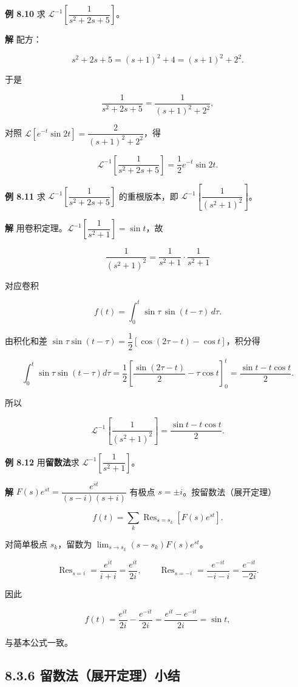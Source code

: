 \textbf{例 8.10} 求
\(\mathcal{L}^{-1}\left[\dfrac{1}{s^2+2s+5}\right]\)。

\textbf{解} 配方：

\[
s^2+2s+5=(s+1)^2+4=(s+1)^2+2^2.
\]

于是

\[
\frac{1}{s^2+2s+5}=\frac{1}{(s+1)^2+2^2},
\]

对照 \(\mathcal{L}[e^{-t}\sin 2t]=\dfrac{2}{(s+1)^2+2^2}\)，得

\[
\mathcal{L}^{-1}\left[\frac{1}{s^2+2s+5}\right]=\frac{1}{2}e^{-t}\sin 2t .
\]

\textbf{例 8.11} 求 \(\mathcal{L}^{-1}\left[\dfrac{1}{s^2+2s+5}\right]\)
的重根版本，即 \(\mathcal{L}^{-1}\left[\dfrac{1}{(s^2+1)^2}\right]\)。

\textbf{解}
用卷积定理。\(\mathcal{L}^{-1}\left[\dfrac{1}{s^2+1}\right]=\sin t\)，故

\[
\frac{1}{(s^2+1)^2}=\frac{1}{s^2+1}\cdot\frac{1}{s^2+1}
\]

对应卷积

\[
f(t)=\int_0^{t}\sin\tau\,\sin(t-\tau)\,d\tau .
\]

由积化和差
\(\sin\tau\sin(t-\tau)=\dfrac{1}{2}[\cos(2\tau-t)-\cos t]\)，积分得

\[
\int_0^{t}\sin\tau\sin(t-\tau)d\tau
=\frac{1}{2}\left[\frac{\sin(2\tau-t)}{2}-\tau\cos t\right]_0^{t}
=\frac{\sin t-t\cos t}{2}.
\]

所以

\[
\mathcal{L}^{-1}\left[\frac{1}{(s^2+1)^2}\right]=\frac{\sin t-t\cos t}{2}.
\]

\textbf{例 8.12} 用\textbf{留数法}求
\(\mathcal{L}^{-1}\left[\dfrac{1}{s^2+1}\right]\)。

\textbf{解} \(F(s)e^{st}=\dfrac{e^{st}}{(s-i)(s+i)}\) 有极点
\(s=\pm i\)。按留数法（展开定理）

\[
f(t)=\sum_{k}\operatorname{Res}_{s=s_k}\left[F(s)e^{st}\right].
\]

对简单极点 \(s_k\)，留数为 \(\lim_{s\to s_k}(s-s_k)F(s)e^{st}\)。

\[
\operatorname{Res}_{s=i}=\frac{e^{it}}{i+i}=\frac{e^{it}}{2i},\qquad
\operatorname{Res}_{s=-i}=\frac{e^{-it}}{-i-i}=\frac{e^{-it}}{-2i}.
\]

因此

\[
f(t)=\frac{e^{it}}{2i}-\frac{e^{-it}}{2i}=\frac{e^{it}-e^{-it}}{2i}=\sin t,
\]

与基本公式一致。

\subsection{8.3.6
留数法（展开定理）小结}\label{ux7559ux6570ux6cd5ux5c55ux5f00ux5b9aux7406ux5c0fux7ed3}

